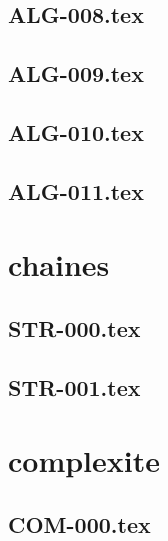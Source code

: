 \renewcommand{\xxexo}{ALG-008.tex} 
\subsection*{\xxexo} 
\graphicspath{{../../exos/algo/ALG-008/}}
 
 
\renewcommand{\xxexo}{ALG-009.tex} 
\subsection*{\xxexo} 
\graphicspath{{../../exos/algo/ALG-009/}}
 
 
\renewcommand{\xxexo}{ALG-010.tex} 
\subsection*{\xxexo} 
\graphicspath{{../../exos/algo/ALG-010/}}
 
 
\renewcommand{\xxexo}{ALG-011.tex} 
\subsection*{\xxexo} 
\graphicspath{{../../exos/algo/ALG-011/}}
 
 
\section*{chaines}
\renewcommand{\xxexo}{STR-000.tex} 
\subsection*{\xxexo} 
\graphicspath{{../../exos/chaines/STR-000/}}
 
 
\renewcommand{\xxexo}{STR-001.tex} 
\subsection*{\xxexo} 
\graphicspath{{../../exos/chaines/STR-001/}}
 
 
\section*{complexite}
\renewcommand{\xxexo}{COM-000.tex} 
\subsection*{\xxexo} 
\graphicspath{{../../exos/complexite/COM-000/}}
 
 

